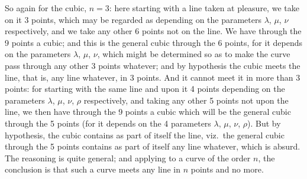 \documentclass[11pt,a4paper]{article}
\begin{document}
So again for the cubic, $n = 3$: here starting with a line taken at pleasure, we take on it 3 points, which may be regarded as depending on the parameters $\lambda$, $\mu$, $\nu$ respectively, and we take any other 6 points not on the line. We have through the 9 points a cubic; and this is the general cubic through the 6 points, for it depends on the parameters $\lambda$, $\mu$, $\nu$, which might be determined so as to make the curve pass through any other 3 points whatever; and by hypothesis the cubic meets the line, that is, any line whatever, in 3 points. And it cannot meet it in more than 3 points: for starting with the same line and upon it 4 points depending on the parameters $\lambda$, $\mu$, $\nu$, $\rho$ respectively, and taking any other 5 points not upon the line, we then have through the 9 points a cubic which will be the general cubic through the 5 points (for it depends on the 4 parameters $\lambda$, $\mu$, $\nu$, $\rho$). But by hypothesis, the cubic contains as part of itself the line, viz.\ the general cubic through the 5 points contains as part of itself any line whatever, which is absurd. The reasoning is quite general; and applying to a curve of the order $n$, the conclusion is that such a curve meets any line in $n$ points and no more.
\end{document}
